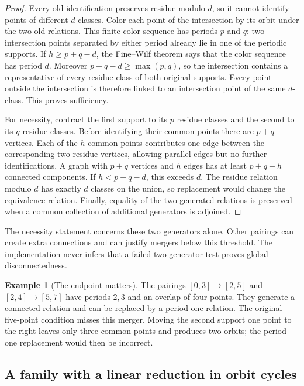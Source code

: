 \documentclass[11pt]{article}
\theoremstyle{definition}
\newtheorem{example}[theorem]{Example}
\begin{document}
\begin{proof}
Every old identification preserves residue modulo $d$, so it cannot
identify points of different $d$-classes. Color each point of the
intersection by its orbit under the two old relations. This finite color
sequence has periods $p$ and $q$: two intersection points separated by
either period already lie in one of the periodic supports. If
$h\ge p+q-d$, the Fine--Wilf theorem \cite{finewilf} says that the color
sequence has period $d$. Moreover $p+q-d\ge\max(p,q)$, so the intersection
contains a representative of every residue class of both original
supports. Every point outside the intersection is therefore linked to an
intersection point of the same $d$-class. This proves sufficiency.

For necessity, contract the first support to its $p$ residue classes and
the second to its $q$ residue classes. Before identifying their common
points there are $p+q$ vertices. Each of the $h$ common points contributes
one edge between the corresponding two residue vertices, allowing parallel edges but no further identifications. A graph with
$p+q$ vertices and $h$ edges has at least $p+q-h$ connected components.
If $h<p+q-d$, this exceeds $d$. The residue relation modulo $d$ has exactly
$d$ classes on the union, so replacement would change the equivalence
relation. Finally, equality of the two generated relations is preserved
when a common collection of additional generators is adjoined.
\end{proof}

The necessity statement concerns these two generators alone. Other
pairings can create extra connections and can justify mergers below this
threshold. The implementation never infers that a failed two-generator
test proves global disconnectedness.

\begin{example}[The endpoint matters]
The pairings $[0,3]\to[2,5]$ and $[2,4]\to[5,7]$ have periods $2,3$
and an overlap of four points. They generate a connected relation and
can be replaced by a period-one relation. The original five-point
condition misses this merger. Moving the second support one point to
the right leaves only three common points and produces two orbits;
the period-one replacement would then be incorrect.
\end{example}

\subsection{A family with a linear reduction in orbit cycles}
\end{document}
